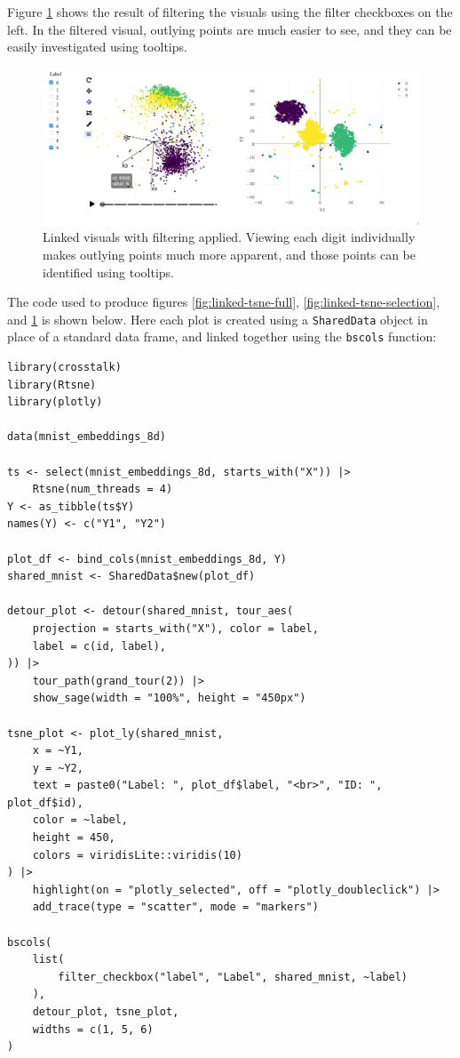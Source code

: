 Figure \ref{fig:linked-tsne-filter} shows the result of filtering the visuals using the filter checkboxes on the left. In the filtered visual, outlying points are much easier to see, and they can be easily investigated using tooltips.

\begin{figure}
\includegraphics[width=\textwidth]{figures/mnist/case-study-linked-brushing-filter} \caption{Linked visuals with filtering applied. Viewing each digit individually makes outlying points much more apparent, and those points can be identified using tooltips.}\label{fig:linked-tsne-filter}
\end{figure}

\pagebreak

The code used to produce figures \ref{fig:linked-tsne-full}, \ref{fig:linked-tsne-selection}, and \ref{fig:linked-tsne-filter} is shown below. Here each plot is created using a  \texttt{SharedData} object in place of a standard data frame, and linked together using the \texttt{bscols} function:

\begin{verbatim}
library(crosstalk)
library(Rtsne)
library(plotly)

data(mnist_embeddings_8d)

ts <- select(mnist_embeddings_8d, starts_with("X")) |>
    Rtsne(num_threads = 4)
Y <- as_tibble(ts$Y)
names(Y) <- c("Y1", "Y2")

plot_df <- bind_cols(mnist_embeddings_8d, Y)
shared_mnist <- SharedData$new(plot_df)

detour_plot <- detour(shared_mnist, tour_aes(
    projection = starts_with("X"), color = label,
    label = c(id, label),
)) |>
    tour_path(grand_tour(2)) |>
    show_sage(width = "100%", height = "450px")

tsne_plot <- plot_ly(shared_mnist,
    x = ~Y1,
    y = ~Y2,
    text = paste0("Label: ", plot_df$label, "<br>", "ID: ", plot_df$id),
    color = ~label,
    height = 450,
    colors = viridisLite::viridis(10)
) |>
    highlight(on = "plotly_selected", off = "plotly_doubleclick") |>
    add_trace(type = "scatter", mode = "markers")

bscols(
    list(
        filter_checkbox("label", "Label", shared_mnist, ~label)
    ),
    detour_plot, tsne_plot,
    widths = c(1, 5, 6)
)
\end{verbatim}

